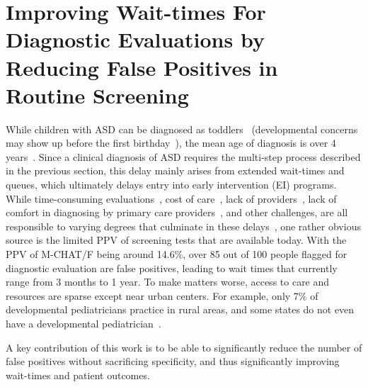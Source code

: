 \documentclass[3p,super,numbers,sort&compress,preprint,10pt]{elsarticle}
\renewcommand{\captionN}[1]{\caption{\color{CadetBlue4!80!black} \sffamily \fontsize{9}{10}\selectfont #1  }}
\begin{document}
\section{Improving Wait-times For  Diagnostic Evaluations by Reducing False Positives  in Routine Screening}\label{sec:waittime}
% 
While children with ASD  can be diagnosed as toddlers~\cite{lord2006autism,kleinman2008diagnostic} (developmental concerns may show up before the first birthday~\cite{bolton2012autism,kozlowski2011parents}), the mean  age of
diagnosis is over 4 years~\cite{baio2014prevalence}. 
%
%
Since a clinical diagnosis of ASD requires the multi-step process described in the previous section, this delay mainly arises from extended   wait-times and queues, which ultimately 
delays entry into early intervention (EI) programs. 
While   time-consuming evaluations~\cite{kalb2012determinants}, cost of care~\cite{bisgaier2011access},  lack of providers~\cite{fenikile2015barriers}, lack of comfort in diagnosing
by primary care providers~\cite{fenikile2015barriers},  and other challenges, are all responsible to varying degrees that culminate in these delays~\cite{gordon2016whittling}, one rather obvious source is the limited PPV of screening tests that are available today. With the PPV of M-CHAT/F being around 14.6\%, over 85 out of 100 people flagged for diagnostic evaluation are false positives, leading to wait times that currently range from 3 months to 1 year. To make matters worse, access to care and resources are sparse  except near urban  centers. For example, only 7\% of developmental pediatricians practice in rural areas, and some states do not even have a developmental pediatrician~\cite{gordon2016whittling,althouse2006pediatric}.

A key contribution of this work is to be able to significantly reduce the number of false positives without sacrificing specificity, and thus significantly  improving wait-times and  patient outcomes.
  
\end{document}

